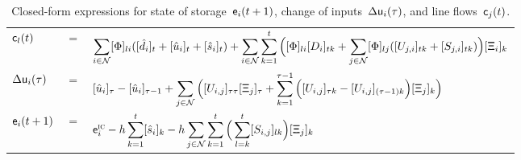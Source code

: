 \documentclass[final,3p,times,twocolumn]{elsarticle}  %
\begin{document}
\begin{table}
	\centering
	\caption{Closed-form expressions for state of storage~$\mathsf{e}_i(t+1)$, change of inputs~$\Delta\mathsf{u}_i(\tau)$, and line flows~$\mathsf{c}_j(t)$.\label{tab:FunctionalDepenendencies}}
	\small
	\begin{tabular}{lll}
		\toprule
		$ \mathsf{c}_l(t) $ & $=$ & $  \displaystyle\sum_{i \in \mathcal{\nbus}} [\ptdfmat]_{li} ( [\hat\load_i]_t + [ \hat\gen_i ]_t +[ \hat\storage_i ]_t ) + \displaystyle\sum_{i \in \mathcal{\nbus}} \sum_{k=1}^{t} \Big( [\ptdfmat]_{li} [\Load_i]_{tk} + \displaystyle \sum_{j \in \mathcal{\nbus}} [\ptdfmat]_{lj} ( [\Gen_{j,i}]_{tk} + [\Storage_{j,i}]_{tk} ) \Big) [\rv\Xi_i]_k $ \\
		$\Delta\mathsf{u}_i(\tau)$ & $=$ & $ [\hat\gen_i]_{\tau} - [\hat\gen_i]_{\tau {-} 1} + \displaystyle \sum_{j \in \mathcal{\nbus}} \Big( [\Gen_{i,j}]_{\tau \tau} [\rv\Xi_j]_{\tau} + \displaystyle \sum_{k=1}^{\tau {-} 1} \Big( [\Gen_{i,j}]_{\tau k} - [\Gen_{i,j}]_{(\tau {-} 1) k} \Big) [\rv\Xi_j]_k \Big)$ \\
		$ \mathsf{e}_i(t+1)$ & $=$ & $\rv\energy_i^{\textsc{ic}} - h \displaystyle \sum_{k=1}^t [\hat\storage_i]_k - h \displaystyle \sum_{j \in \mathcal{\nbus}} \sum_{k=1}^t \Big( \displaystyle \sum_{l=k}^t [\Storage_{i,j}]_{lk} \Big) [\rv\Xi_j]_k $ \\
		\bottomrule
	\end{tabular}
\end{table}
\end{document}
